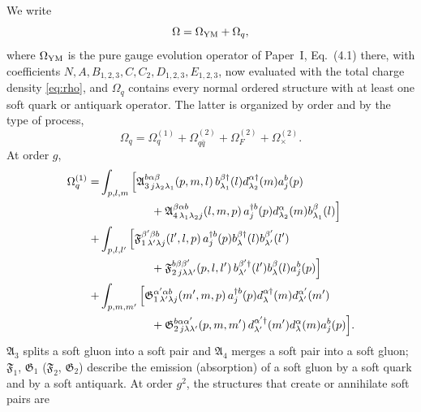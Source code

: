\documentclass[11pt,a4paper]{article}
\numberwithin{equation}{section}
\newcommand{\mf}[1]{\mathfrak{#1}}
\newcommand{\dg}{\dagger}
\newcommand{\OM}{\Omega}
\begin{document}
We write
\begin{equation}
\OM=\OM_{\rm YM}+\OM_{q},
\label{eq:OmegaSplit}
\end{equation}
where $\OM_{\rm YM}$ is the pure gauge evolution operator of Paper~I, Eq.~(4.1) there, with
coefficients $N,A,B_{1,2,3},C,C_{2},D_{1,2,3},E_{1,2,3}$, now evaluated with the total charge
density \eqref{eq:rho}, and $\OM_{q}$ contains every normal ordered structure with at least one
soft quark or antiquark operator. The latter is organized by order and by the type of process,
\begin{equation}
\OM_{q}=\OM^{(1)}_{q}+\OM^{(2)}_{q\bar q}+\OM^{(2)}_{F}+\OM^{(2)}_{\times}.
\label{eq:Omqdecomp}
\end{equation}
At order $g$,
\begin{align}
\OM^{(1)}_{q}=&\int_{p,l,m}\Big[\mf A^{b\alpha\beta}_{3\,j\lambda_{2}\lambda_{1}}(p,m,l)\,
b^{\beta\dg}_{\lambda_{1}}(l)d^{\alpha\dg}_{\lambda_{2}}(m)a^{b}_{j}(p)
\nonumber\\&\hspace{1.6cm}
+\mf A^{\beta\alpha b}_{4\,\lambda_{1}\lambda_{2}j}(l,m,p)\,
a^{\dg b}_{j}(p)d^{\alpha}_{\lambda_{2}}(m)b^{\beta}_{\lambda_{1}}(l)\Big]
\nonumber\\
+&\int_{p,l,l'}\Big[\mf F^{\beta'\beta b}_{1\,\lambda'\lambda j}(l',l,p)\,
a^{\dg b}_{j}(p)b^{\beta\dg}_{\lambda}(l)b^{\beta'}_{\lambda'}(l')
\nonumber\\&\hspace{1.6cm}
+\mf F^{b\beta\beta'}_{2\,j\lambda\lambda'}(p,l,l')\,
b^{\beta'\dg}_{\lambda'}(l')b^{\beta}_{\lambda}(l)a^{b}_{j}(p)\Big]
\nonumber\\
+&\int_{p,m,m'}\Big[\mf G^{\alpha'\alpha b}_{1\,\lambda'\lambda j}(m',m,p)\,
a^{\dg b}_{j}(p)d^{\alpha\dg}_{\lambda}(m)d^{\alpha'}_{\lambda'}(m')
\nonumber\\&\hspace{1.6cm}
+\mf G^{b\alpha\alpha'}_{2\,j\lambda\lambda'}(p,m,m')\,
d^{\alpha'\dg}_{\lambda'}(m')d^{\alpha}_{\lambda}(m)a^{b}_{j}(p)\Big].
\label{eq:Om1q}
\end{align}
$\mf A_{3}$ splits a soft gluon into a soft pair and $\mf A_{4}$ merges a soft pair into a soft gluon;
$\mf F_{1}$, $\mf G_{1}$ ($\mf F_{2}$, $\mf G_{2}$) describe the emission (absorption) of a soft gluon
by a soft quark and by a soft antiquark. At order $g^{2}$, the structures that create or
annihilate soft pairs are
\end{document}
